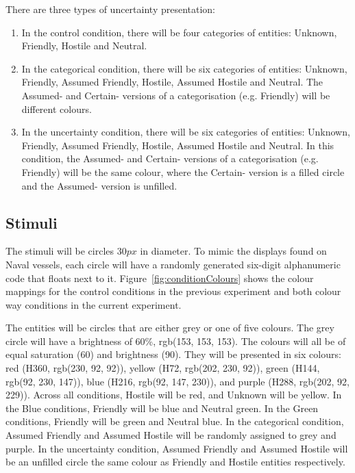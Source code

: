 \documentclass[doc, a4paper, apacite]{apa6}
\begin{document}
There are three types of uncertainty presentation:
\begin{enumerate}
	\item In the control condition, there will be four categories of entities: Unknown, Friendly, Hostile and Neutral.\\
	\item In the categorical condition, there will be six categories of entities: Unknown, Friendly, Assumed Friendly, Hostile, Assumed Hostile and Neutral. The Assumed- and Certain- versions of a categorisation (e.g. Friendly) will be different colours. 
	\item In the uncertainty condition, there will be six categories of entities: Unknown, Friendly, Assumed Friendly, Hostile, Assumed Hostile and Neutral. In this condition, the Assumed- and Certain- versions of a categorisation (e.g. Friendly) will be the same colour, where the Certain- version is a filled circle and the Assumed- version is unfilled. 
\end{enumerate}

\subsection{Stimuli}
The stimuli will be circles $30px$ in diameter. 
To mimic the displays found on Naval vessels, each circle will have a randomly generated six-digit alphanumeric code that floats next to it. 
Figure~\ref{fig:conditionColours} shows the colour mappings for the control conditions in the previous experiment and both colour way conditions in the current experiment. 

The entities will be circles that are either grey or one of five colours. 
The grey circle will have a brightness of 60\%, rgb(153, 153, 153). 
The colours will all be of equal saturation (60) and brightness (90). 
They will be presented in six colours: red (H360, rgb(230, 92, 92)), yellow (H72, rgb(202, 230, 92)), green (H144, rgb(92, 230, 147)), blue (H216, rgb(92, 147, 230)), and purple (H288, rgb(202, 92, 229)).
Across all conditions, Hostile will be red, and Unknown will be yellow. 
In the Blue conditions, Friendly will be blue and Neutral green. 
In the Green conditions, Friendly will be green and Neutral blue. 
In the categorical condition, Assumed Friendly and Assumed Hostile will be randomly assigned to grey and purple. 
In the uncertainty condition, Assumed Friendly and Assumed Hostile will be an unfilled circle the same colour as Friendly and Hostile entities respectively. 
\end{document}
